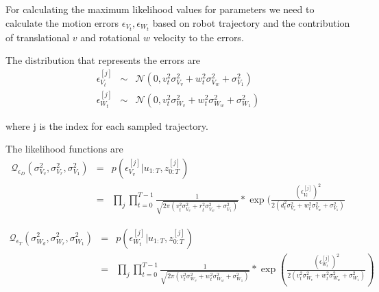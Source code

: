 \documentclass[12pt]{dalcsthesis}
\begin{document}
For calculating the maximum likelihood values for parameters we need to calculate the motion errors $\epsilon_{V_{t}}, \epsilon_{W_{t}}$ based on robot trajectory and the contribution of translational $v$ and rotational $w$ velocity to the errors.

The distribution that represents the errors are 
\begin{eqnarray}
\epsilon_{V_{t}}^{[j]}&\sim&\mathcal{{N}}(0,v_{t}^{2}\sigma_{V_{v}}^{2}+w_{t}^{2}\sigma_{V_{w}}^{2}+\sigma_{V_{1}}^{2})\\
\epsilon_{W_{t}}^{[j]}&\sim&\mathcal{{N}}(0,v_{t}^{2}\sigma_{W_{v}}^{2}+w_{t}^{2}\sigma_{W_{w}}^{2}+\sigma_{W_{1}}^{2})
\end{eqnarray}

where j is the index for each sampled trajectory.

The likelihood functions are 
\begin{eqnarray}
\mathcal{Q}_{\epsilon_{D}}(\sigma_{V_{v}}^{2},\sigma_{V_{r}}^{2},\sigma_{V_{1}}^{2}) & = & p(\epsilon_{V_{v}}^{[j]}|u_{1:T},z_{0:T}^{[j]})\\
 & = & \prod_{j}\prod_{t=0}^{T-1}\frac{1}{\sqrt{2\pi(v_{t}^{2}\sigma_{V_{v}}^{2}+r_{t}^{2}\sigma_{V_{w}}^{2}+\sigma_{V_{1}}^{2})}}*\exp(\frac{(\epsilon_{V_{t}}^{[j]})^{2}}{2(d_{t}^{2}\sigma_{V_{v}}^{2}+w_{t}^{2}\sigma_{V_{w}}^{2}+\sigma_{V_{1}}^{2})}
\end{eqnarray}



\begin{eqnarray*}
\mathcal{Q}_{\epsilon_{T}}(\sigma_{W_{d}}^{2},\sigma_{W_{r}}^{2},\sigma_{W_{1}}^{2}) & = & p(\epsilon_{W_{t}}^{[j]}|u_{1:T},z_{0:T}^{[j]})\\
 & = & \prod_{j}\prod_{t=0}^{T-1}\frac{1}{\sqrt{2\pi(v_{t}^{2}\sigma_{W_{v}}^{2}+w_{t}^{2}\sigma_{W_{w}}^{2}+\sigma_{W_{1}}^{2})}}*\exp(\frac{(\epsilon_{W_{t}}^{[j]})^{2}}{2(v_{t}^{2}\sigma_{W_{v}}^{2}+w_{t}^{2}\sigma_{W_{w}}^{2}+\sigma_{W_{1}}^{2})})
\end{eqnarray*}
\end{document}
